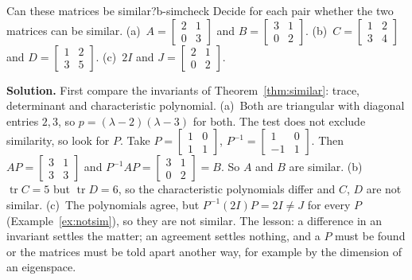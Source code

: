 \documentclass[11pt]{article}
\begin{document}
\begin{exmp}{Can these matrices be similar?}{b-simcheck}
Decide for each pair whether the two matrices can be similar. (a)~$A=\begin{bmatrix}2&1\\0&3\end{bmatrix}$ and $B=\begin{bmatrix}3&1\\0&2\end{bmatrix}$. (b)~$C=\begin{bmatrix}1&2\\3&4\end{bmatrix}$ and $D=\begin{bmatrix}1&2\\3&5\end{bmatrix}$. (c)~$2I$ and $J=\begin{bmatrix}2&1\\0&2\end{bmatrix}$.

\textbf{Solution.} First compare the invariants of Theorem~\ref{thm:similar}: trace, determinant and characteristic polynomial. (a)~Both are triangular with diagonal entries $2,3$, so $p=(\lambda-2)(\lambda-3)$ for both. The test does not exclude similarity, so look for $P$. Take $P=\begin{bmatrix}1&0\\1&1\end{bmatrix}$, $P^{-1}=\begin{bmatrix}1&0\\-1&1\end{bmatrix}$. Then $AP=\begin{bmatrix}3&1\\3&3\end{bmatrix}$ and $P^{-1}AP=\begin{bmatrix}3&1\\0&2\end{bmatrix}=B$. So $A$ and $B$ are similar. (b)~$\operatorname{tr}C=5$ but $\operatorname{tr}D=6$, so the characteristic polynomials differ and $C$, $D$ are not similar. (c)~The polynomials agree, but $P^{-1}(2I)P=2I\neq J$ for every $P$ (Example~\ref{ex:notsim}), so they are not similar. The lesson: a difference in an invariant settles the matter; an agreement settles nothing, and a $P$ must be found or the matrices must be told apart another way, for example by the dimension of an eigenspace.
\end{exmp}
\end{document}
